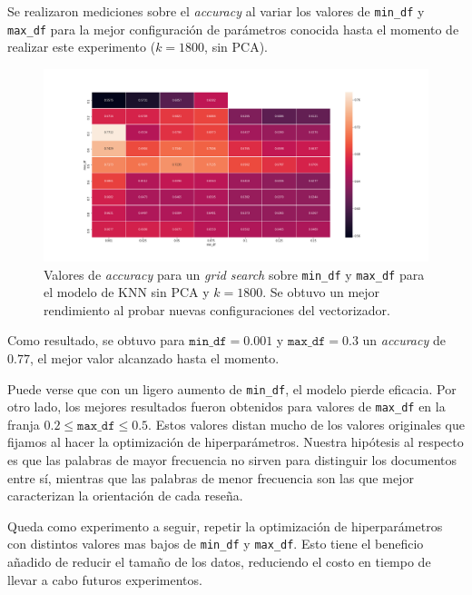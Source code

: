 
Se realizaron mediciones sobre el \textit{accuracy} al variar los valores de
\texttt{min\_df} y \texttt{max\_df} para la mejor configuración de parámetros
conocida hasta el momento de realizar este experimento ($k=1800$, sin PCA).

\begin{figure}[h]
\includegraphics[width=\textwidth]{./img/exp_maxmindf.png}
\centering
\caption{
Valores de \textit{accuracy} para un \textit{grid search} sobre
\texttt{min\_df} y \texttt{max\_df} para el modelo de KNN sin PCA y $k=1800$.
Se obtuvo un mejor rendimiento al probar nuevas configuraciones del
vectorizador.
}
\label{fig:param-big}
\end{figure}

Como resultado, se obtuvo para $\mathtt{min\_df}=0.001$ y
$\mathtt{max\_df}=0.3$ un \textit{accuracy} de $0.77$, el mejor valor alcanzado
hasta el momento.

Puede verse que con un ligero aumento de \texttt{min\_df}, el modelo pierde
eficacia. Por otro lado, los mejores resultados fueron obtenidos para valores
de \texttt{max\_df} en la franja $0.2 \leq \mathtt{max\_df} \leq 0.5$. Estos
valores distan mucho de los valores originales que fijamos al hacer la
optimización de hiperparámetros. Nuestra hipótesis al respecto es que las
palabras de mayor frecuencia no sirven para distinguir los documentos entre sí,
mientras que las palabras de menor frecuencia son las que mejor caracterizan la
orientación de cada reseña.

Queda como experimento a seguir, repetir la optimización de hiperparámetros con
distintos valores mas bajos de \texttt{min\_df} y \texttt{max\_df}. Esto tiene
el beneficio añadido de reducir el tamaño de los datos, reduciendo el costo en
tiempo de llevar a cabo futuros experimentos.
